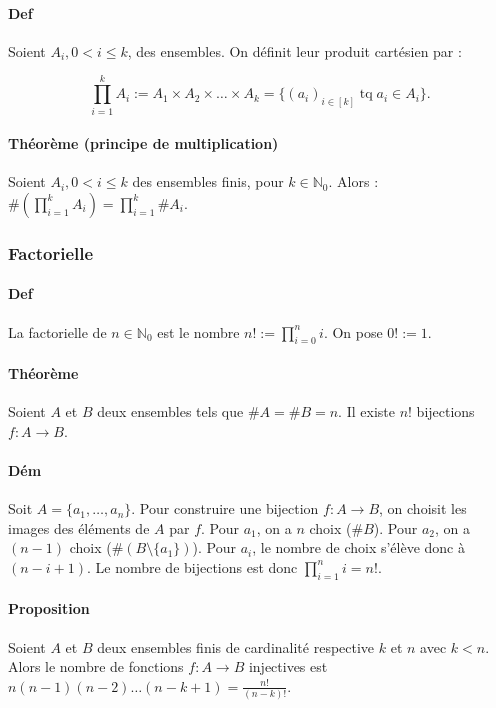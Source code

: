\documentclass{article}
\DeclareMathOperator{\tq}{\text{ tq }}
\begin{document}
			\paragraph{Def} Soient $A_i, 0 < i \leq k$, des ensembles. On définit leur produit cartésien par :
			
			\[\prod_{i=1}^kA_i := A_1 \times A_2 \times \ldots \times A_k = \{(a_i)_{i \in [k]} \tq a_i \in A_i\}.\]
			
			\paragraph{Théorème (principe de multiplication)} Soient $A_i, 0 < i \leq k$ des ensembles finis, pour $k \in \mathbb N_0$. Alors :
			$\#\left(\prod_{i=1}^kA_i\right) = \prod_{i=1}^k\#A_i$.
			
			\subsubsection{Factorielle}
			
			\paragraph{Def} La factorielle de $n \in \mathbb N_0$ est le nombre $n! := \prod_{i=0}^ni$. On pose $0! := 1$.
			
			\paragraph{Théorème} Soient $A$ et $B$ deux ensembles tels que $\#A = \#B = n$. Il existe $n!$ bijections $f : A \to B$.
			
			\paragraph{Dém} Soit $A = \{a_1, \ldots, a_n\}$. Pour construire une bijection $f : A \to B$, on choisit les images des éléments de $A$ par $f$. Pour $a_1$,
			on a $n$ choix ($\#B$). Pour $a_2$, on a $(n-1)$ choix ($\#(B \setminus \{a_1\})$). Pour $a_i$, le nombre de choix s'élève donc à $(n-i+1)$.
			Le nombre de bijections est donc $\prod_{i=1}^ni = n!$.
			
			\paragraph{Proposition} Soient $A$ et $B$ deux ensembles finis de cardinalité respective $k$ et $n$ avec $k < n$. Alors le nombre de fonctions $f : A \to B$
			injectives est $n(n-1)(n-2)\ldots(n-k+1) = \frac {n!}{(n-k)!}$.
			
\end{document}
